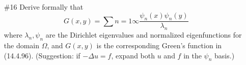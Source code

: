 \documentclass[11pt, oneside]{article}
\begin{document}
\begin{enumerate}
  \pagebreak
  \item[\#16]
    Derive formally that
    \[
      G(x, y) = \sum{n=1}{\infty}{\frac{\psi_n(x) \psi_n(y)}{\lambda_n}}
    \]
    where $\lambda_n, \psi_n$ are the Dirichlet eigenvalues and normalized
    eigenfunctions for the domain $\Omega$, and $G(x, y)$ is the corresponding
    Green's function in (14.4.96).
    (Suggestion: if $-\Delta u = f$, expand both $u$ and $f$ in the $\psi_n$
    basis.)
\end{enumerate}
\end{document}
